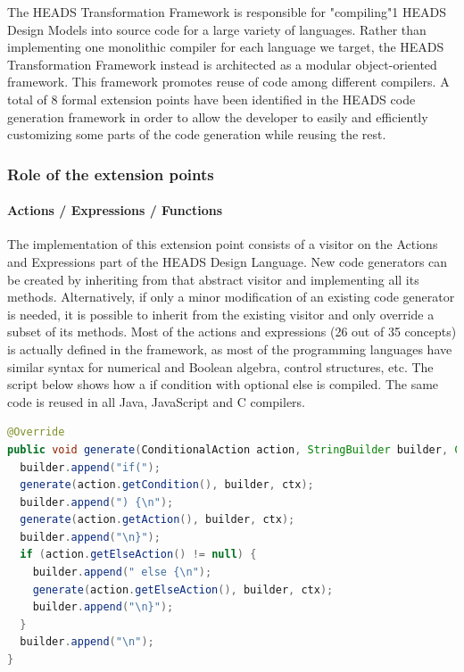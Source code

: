 The HEADS Transformation Framework is responsible for "compiling"1  HEADS Design Models into source code for a large variety of languages. Rather than implementing one monolithic compiler for each language we target, the HEADS Transformation Framework instead is architected as a modular object-oriented framework. This framework promotes reuse of code among different compilers. A total of 8 formal extension points have been identified in the HEADS code generation framework in order to allow the developer to easily and efficiently customizing some parts of the code generation while reusing the rest. 

\subsubsection{Role of the extension points}

\paragraph{Actions / Expressions / Functions }


The implementation of this extension point consists of a visitor on the Actions and Expressions part of the HEADS Design Language. New code generators can be created by inheriting from that abstract visitor and implementing all its methods. Alternatively, if only a minor modification of an existing code generator is needed, it is possible to inherit from the existing visitor and only override a subset of its methods. Most of the actions and expressions (26 out of 35 concepts) is actually defined in the framework, as most of the programming languages have similar syntax for numerical and Boolean algebra, control structures, etc. The script below shows how a if  condition with optional else is compiled. The same code is reused in all Java, JavaScript and C compilers. 

\begin{lstlisting}[language=Java]
@Override 
public void generate(ConditionalAction action, StringBuilder builder, Context ctx) { 
  builder.append("if("); 
  generate(action.getCondition(), builder, ctx); 
  builder.append(") {\n"); 
  generate(action.getAction(), builder, ctx); 
  builder.append("\n}"); 
  if (action.getElseAction() != null) { 
    builder.append(" else {\n"); 
    generate(action.getElseAction(), builder, ctx); 
    builder.append("\n}"); 
  } 
  builder.append("\n"); 
} 
\end{lstlisting}

